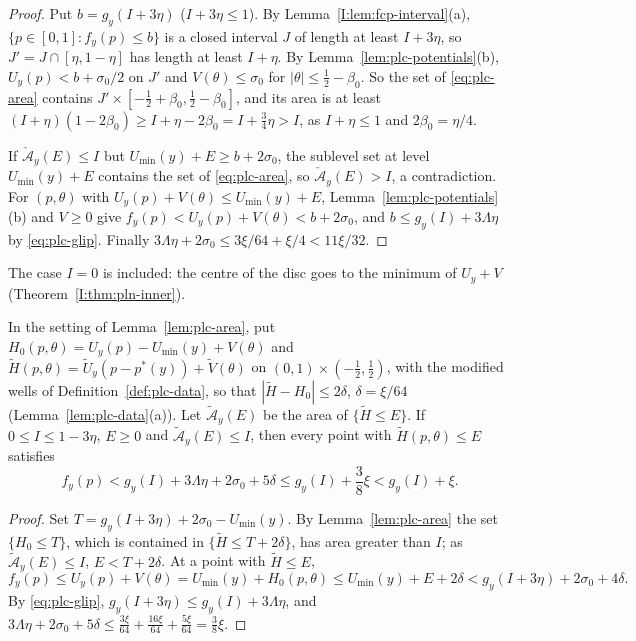 \begin{proof}
Put $b=g_y(I+3\eta)$ ($I+3\eta\le1$). By Lemma~\ref{I:lem:fcp-interval}(a), $\{p\in[0,1]:f_y(p)\le b\}$ is a closed
interval $J$ of length at least $I+3\eta$, so $J'=J\cap[\eta,1-\eta]$ has length at least $I+\eta$. By
Lemma~\ref{lem:plc-potentials}(b), $U_y(p)<b+\sigma_0/2$ on $J'$ and $V(\theta)\le\sigma_0$ for $|\theta|\le\frac12-\beta_0$. So the set of
\eqref{eq:plc-area} contains $J'\times[-\frac12+\beta_0,\frac12-\beta_0]$, and its area is at least
$(I+\eta)(1-2\beta_0)\ge I+\eta-2\beta_0=I+\frac34\eta>I$, as $I+\eta\le1$ and $2\beta_0=\eta/4$.

If $\check{\mathcal A}_y(E)\le I$ but $U_{\min}(y)+E\ge b+2\sigma_0$, the sublevel set at level $U_{\min}(y)+E$ contains the set of
\eqref{eq:plc-area}, so $\check{\mathcal A}_y(E)>I$, a contradiction. For $(p,\theta)$ with $U_y(p)+V(\theta)\le U_{\min}(y)+E$,
Lemma~\ref{lem:plc-potentials}(b) and $V\ge0$ give $f_y(p)<U_y(p)+V(\theta)<b+2\sigma_0$, and $b\le g_y(I)+3\Lambda\eta$ by
\eqref{eq:plc-glip}. Finally $3\Lambda\eta+2\sigma_0\le3\xi/64+\xi/4<11\xi/32$.
\end{proof}

The case $I=0$ is included: the centre of the disc goes to the minimum of $U_y+V$ (Theorem~\ref{I:thm:pln-inner}).

\begin{lemma}\label{lem:plc-modified-area}
In the setting of Lemma~\ref{lem:plc-area}, put $H_0(p,\theta)=U_y(p)-U_{\min}(y)+V(\theta)$ and
$\widetilde H(p,\theta)=\widetilde U_y(p-p^*(y))+\widetilde V(\theta)$ on $(0,1)\times(-\frac12,\frac12)$, with the modified wells
of Definition~\ref{def:plc-data}, so that $|\widetilde H-H_0|\le2\delta$, $\delta=\xi/64$ (Lemma~\ref{lem:plc-data}(a)). Let
$\widetilde{\mathcal A}_y(E)$ be the area of $\{\widetilde H\le E\}$.
If $0\le I\le1-3\eta$, $E\ge0$ and $\widetilde{\mathcal A}_y(E)\le I$, then every point with
$\widetilde H(p,\theta)\le E$ satisfies
\[
 f_y(p)<g_y(I)+3\Lambda\eta+2\sigma_0+5\delta
 \le g_y(I)+\frac38\xi<g_y(I)+\xi.
\]
\end{lemma}

\begin{proof}
Set $T=g_y(I+3\eta)+2\sigma_0-U_{\min}(y)$. By Lemma~\ref{lem:plc-area} the set $\{H_0\le T\}$, which is contained in
$\{\widetilde H\le T+2\delta\}$, has area greater than $I$; as $\widetilde{\mathcal A}_y(E)\le I$, $E<T+2\delta$. At a point
with $\widetilde H\le E$,
\[
 f_y(p)\le U_y(p)+V(\theta)
 =U_{\min}(y)+H_0(p,\theta)
 \le U_{\min}(y)+E+2\delta
 <g_y(I+3\eta)+2\sigma_0+4\delta.
\]
By \eqref{eq:plc-glip}, $g_y(I+3\eta)\le g_y(I)+3\Lambda\eta$, and
$3\Lambda\eta+2\sigma_0+5\delta\le\frac{3\xi}{64}+\frac{16\xi}{64}+\frac{5\xi}{64}=\frac38\xi$.
\end{proof}

